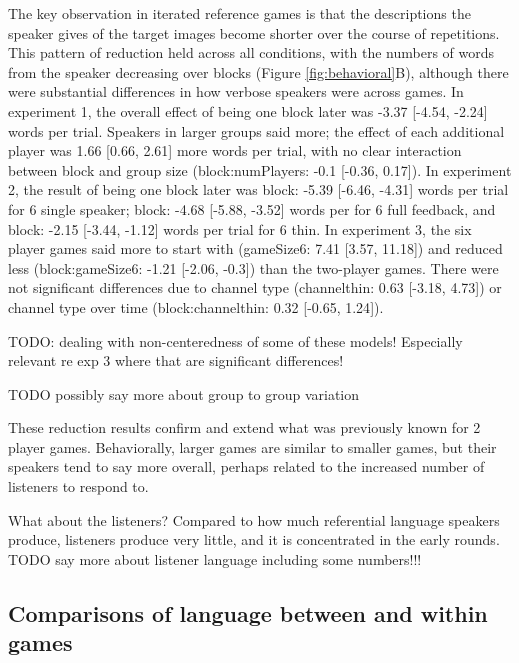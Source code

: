 \documentclass[
  english,
  a4paper,
]{article}
\begin{document}
The key observation in iterated reference games is that the descriptions the speaker gives of the target images become shorter over the course of repetitions. This pattern of reduction held across all conditions, with the numbers of words from the speaker decreasing over blocks (Figure \ref{fig:behavioral}B), although there were substantial differences in how verbose speakers were across games. In experiment 1, the overall effect of being one block later was -3.37 {[}-4.54, -2.24{]} words per trial. Speakers in larger groups said more; the effect of each additional player was 1.66 {[}0.66, 2.61{]} more words per trial, with no clear interaction between block and group size (block:numPlayers: -0.1 {[}-0.36, 0.17{]}). In experiment 2, the result of being one block later was block: -5.39 {[}-6.46, -4.31{]} words per trial for 6 single speaker; block: -4.68 {[}-5.88, -3.52{]} words per for 6 full feedback, and block: -2.15 {[}-3.44, -1.12{]} words per trial for 6 thin. In experiment 3, the six player games said more to start with (gameSize6: 7.41 {[}3.57, 11.18{]}) and reduced less (block:gameSize6: -1.21 {[}-2.06, -0.3{]}) than the two-player games. There were not significant differences due to channel type (channelthin: 0.63 {[}-3.18, 4.73{]}) or channel type over time (block:channelthin: 0.32 {[}-0.65, 1.24{]}).

TODO: dealing with non-centeredness of some of these models! Especially relevant re exp 3 where that are significant differences!

TODO possibly say more about group to group variation

These reduction results confirm and extend what was previously known for 2 player games. Behaviorally, larger games are similar to smaller games, but their speakers tend to say more overall, perhaps related to the increased number of listeners to respond to.

What about the listeners? Compared to how much referential language speakers produce, listeners produce very little, and it is concentrated in the early rounds. TODO say more about listener language including some numbers!!!

\hypertarget{comparisons-of-language-between-and-within-games}{%
\subsection{Comparisons of language between and within games}\label{comparisons-of-language-between-and-within-games}}
\end{document}

